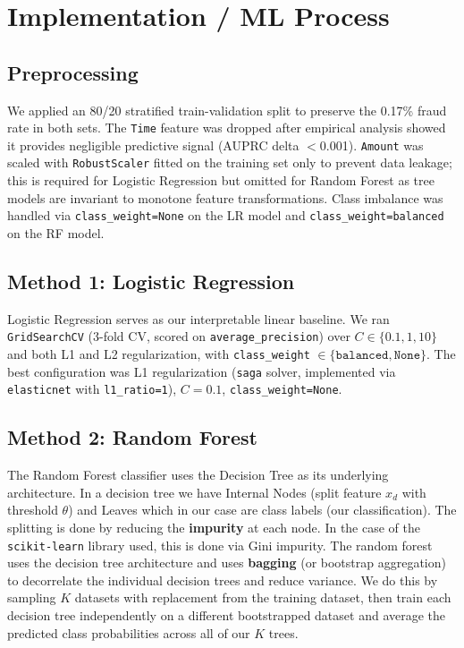 \documentclass[a4, 10 pt, conference]{ieeeconf}
\begin{document}
\section{Implementation / ML Process}
\label{sec:methods}

\subsection{Preprocessing}

We applied an 80/20 stratified train-validation split to preserve the 0.17\%
fraud rate in both sets. The \texttt{Time} feature was dropped after empirical
analysis showed it provides negligible predictive signal (AUPRC delta $<$0.001).
\texttt{Amount} was scaled with \texttt{RobustScaler} fitted on the training set
only to prevent data leakage; this is required for Logistic Regression but
omitted for Random Forest as tree models are invariant to monotone feature
transformations. Class imbalance was handled via \texttt{class\_weight=None}
on the LR model and \texttt{class\_weight=balanced} on the RF model.

\subsection{Method 1: Logistic Regression}

Logistic Regression serves as our interpretable linear baseline. We ran
\texttt{GridSearchCV} (3-fold CV, scored on \texttt{average\_precision}) over $C
\in \{0.1, 1, 10\}$ and both L1 and L2 regularization, with
\texttt{class\_weight} $\in \{\texttt{balanced},\texttt{None}\}$. The best
configuration was L1 regularization (\texttt{saga} solver, implemented via
\texttt{elasticnet} with \texttt{l1\_ratio=1}), $C=0.1$,
\texttt{class\_weight=None}.

\subsection{Method 2: Random Forest}

The Random Forest classifier uses the Decision Tree as its underlying
architecture. In a decision tree we have Internal Nodes (split feature $x_d$
with threshold $\theta$) and Leaves which in our case are class labels (our
classification). The splitting is done by reducing the \textbf{impurity} at each
node. In the case of the \texttt{scikit-learn} library used, this is done via
Gini impurity. The random forest uses the decision tree architecture and uses
\textbf{bagging} (or bootstrap aggregation) to decorrelate the individual
decision trees and reduce variance. We do this by sampling $K$ datasets with
replacement from the training dataset, then train each decision tree
independently on a different bootstrapped dataset and average the predicted
class probabilities across all of our $K$ trees.
\end{document}
